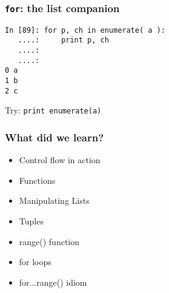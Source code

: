 \documentclass[14pt,compress]{beamer}
\newcounter{time}
\newcommand{\inctime}[1]{\addtocounter{time}{#1}{\tiny \thetime\ m}}
\newcommand{\typ}[1]{\texttt{#1}}
\begin{document}
\begin{frame}[fragile]
  \frametitle{\typ{for}: the list companion}
  \begin{lstlisting}
In [89]: for p, ch in enumerate( a ):
   ....:     print p, ch
   ....:     
   ....:     
0 a
1 b
2 c
  \end{lstlisting}
Try: \typ{print enumerate(a)}
\inctime{10}
\end{frame}


\begin{frame}
  \frametitle{What did we learn?}
  \begin{itemize}
    \item Control flow in action
    \item Functions
    \item Manipulating Lists 
    \item Tuples
    \item range() function
    \item for loops
    \item for...range() idiom
  \end{itemize}
\end{frame}
\end{document}
